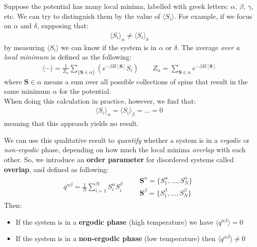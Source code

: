 \documentclass[../template.tex]{subfiles}
\begin{document}
Suppose the potential has many local minima, labelled with greek letters: $\alpha$, $\beta$, $\gamma$, etc. 
We can try to distinguish them by the value of $\langle S_i \rangle$. For example, if we focus on $\alpha$ and $\delta$, supposing that:  
\begin{align*}
    \langle S_i \rangle_\alpha \neq \langle S_i \rangle_{\delta}
\end{align*}     
by measuring $\langle S_i \rangle$ we can know if the system is in $\alpha$ or $\delta$.    
The average \textit{over a local minimum} is defined as the following:
\begin{align*}
    \langle \cdots \rangle = \frac{1}{Z_{\alpha}} \sum_{\{\bm{S} \in \alpha\}} \left( e^{-\beta H[\bm{S}] }S_i\right)  \qquad Z_\alpha = \sum_{\bm{S} \in \alpha} e^{-\beta H[\bm{S}] }
\end{align*} 
where $\bm{S} \in \alpha$ means a sum over all possible collections of spins that result in the same minimum $\alpha$ for the potential.\\  
When doing this calculation in practice, however, we find that:
\begin{align*}
    \langle S_i \rangle_\alpha = \langle S_i \rangle_{\beta} = \dots = 0
\end{align*}
meaning that this approach yields no result.

We can use this qualitative result to \textit{quantify} whether a system is in a \textit{ergodic} or \textit{non-ergodic} phase, depending on how much the local minima \textit{overlap} with each other.    
So, we introduce an \textbf{order parameter} for disordered systems called \textbf{overlap}, and defined as following:
\begin{align*}
    q^{\alpha \beta} = \frac{1}{N} \sum_{i=1}^N S_i^\alpha S_i^\beta \qquad \substack{\displaystyle\bm{S}^\alpha = \{S_1^\alpha, \dots, S_N^\alpha\}\\\displaystyle \bm{S}^\beta = \{S_1^\beta, \dots, S_N^\beta\}}
\end{align*}  
Then:
\begin{itemize}
    \item If the system is in a \textbf{ergodic phase} (high temperature) we have $\langle q^{\alpha \beta} \rangle = 0$ 
    \item If the system is in a \textbf{non-ergodic phase} (low temperature) then $\langle q^{\alpha \beta} \rangle \neq 0$   
\end{itemize}
\end{document}
